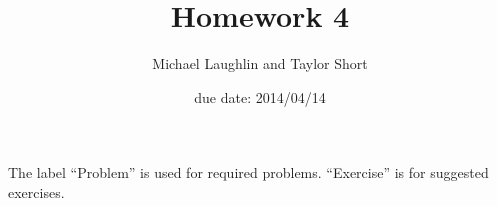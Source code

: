 
         \newcommand\alg[1]{\ensuremath{\mathbf{#1}}}
         \newcommand{\<}{\ensuremath{\langle}}
         \renewcommand{\>}{\ensuremath{\rangle}}
         \newcommand\fld[1]{\ensuremath{\mathbb{#1}}}
         \newcommand\Z{\fld{Z}}
         \newcommand\GF{\ensuremath{\operatorname{GF}}}
         \author{Michael Laughlin and Taylor Short}
         \title{Homework 4}
         \date{due date: 2014/04/14}



\maketitle

\noindent The label ``Problem'' is used for required problems. ``Exercise''
is for suggested exercises.

